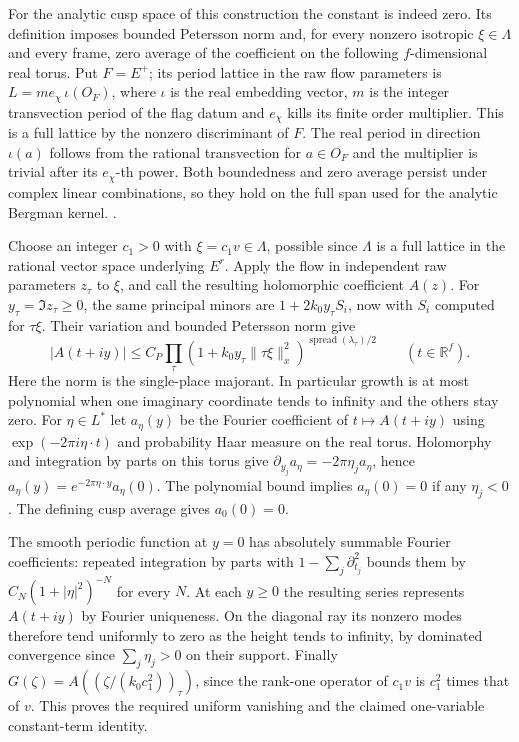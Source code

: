For the analytic cusp space of this construction the constant is
indeed zero. Its definition imposes bounded Petersson norm and,
for every nonzero isotropic \(\xi\in\Lambda\) and every frame,
zero average of the coefficient on the following \(f\)-dimensional
real torus. Put \(F=E^+\); its period lattice in the raw flow
parameters is \(L=m e_\chi\,\iota(O_F)\), where \(\iota\) is the
real embedding vector, \(m\) is the integer transvection period of
the flag datum and \(e_\chi\) kills its finite order multiplier.
This is a full lattice by the nonzero discriminant of \(F\).
The real period in direction \(\iota(a)\) follows from the
rational transvection for \(a\in O_F\) and the multiplier is
trivial after its \(e_\chi\)-th power. Both boundedness and
zero average persist under complex linear combinations, so they
hold on the full span used for the analytic Bergman kernel.
.

Choose an integer \(c_1>0\) with \(\xi=c_1v\in\Lambda\), possible
since \(\Lambda\) is a full lattice in the rational vector space
underlying \(E^r\). Apply the flow in independent raw
parameters \(z_\tau\) to \(\xi\), and call the resulting holomorphic
coefficient \(A(z)\). For \(y_\tau=\Im z_\tau\ge0\), the same
principal minors are \(1+2 k_0 y_\tau S_i\), now with \(S_i\)
computed for \(\tau\xi\). Their variation and bounded Petersson norm
give
\[
 |A(t+iy)|\le C_P\prod_\tau
 (1+k_0 y_\tau\|\tau\xi\|_x^2)^{\operatorname{spread}(\lambda_\tau)/2}
 \qquad(t\in\mathbb R^f).
\]
Here the norm is the single-place majorant. In particular growth is
at most polynomial when one imaginary coordinate tends to infinity
and the others stay zero. For \(\eta\in L^*\) let \(a_\eta(y)\)
be the Fourier coefficient of \(t\mapsto A(t+iy)\) using
\(\exp(-2\pi i\eta\cdot t)\) and probability Haar measure on the
real torus. Holomorphy and integration by parts on this torus give
\(\partial_{y_j}a_\eta=-2\pi\eta_j a_\eta\), hence
\(a_\eta(y)=e^{-2\pi\eta\cdot y}a_\eta(0)\).
The polynomial bound implies \(a_\eta(0)=0\) if any \(\eta_j<0\).
The defining cusp average gives \(a_0(0)=0\).

The smooth periodic function at \(y=0\) has absolutely summable
Fourier coefficients: repeated integration by parts with
\(1-\sum_j\partial_{t_j}^2\) bounds them by
\(C_N(1+|\eta|^2)^{-N}\) for every \(N\).
At each \(y\ge0\) the resulting series represents \(A(t+iy)\)
by Fourier uniqueness. On the diagonal ray its nonzero modes
therefore tend uniformly to zero as the height tends to infinity,
by dominated convergence since \(\sum_j\eta_j>0\) on their support.
Finally \(G(\zeta)=A((\zeta/(k_0c_1^2))_\tau)\), since the
rank-one operator of \(c_1v\) is \(c_1^2\) times that of \(v\).
This proves the required uniform vanishing and the claimed
one-variable constant-term identity.

